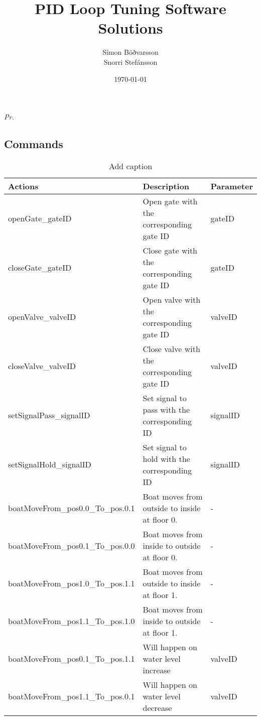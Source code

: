 \documentclass[11pt,a4paper]{article}
\title{PID Loop Tuning Software Solutions}
\author{Símon Böðvarsson \\ Snorri Stefánsson}
\date{\today}
\begin{document}
\textit{Pr.}

\subsection{Commands}

\begin{table}[htbp]
	\centering
	\caption{Add caption}
	\begin{tabular}{lll}
		\toprule
		\textbf{Actions} & \textbf{Description} & \textbf{Parameter} \\
		\midrule
		openGate\_gateID & Open gate with the corresponding gate ID & gateID \\
		closeGate\_gateID & Close gate with the corresponding gate ID & gateID \\
		openValve\_valveID & Open valve with the corresponding gate ID & valveID \\
		closeValve\_valveID & Close valve with the corresponding gate ID & valveID \\
		setSignalPass\_signalID & Set signal to pass with the corresponding ID  & signalID \\
		setSignalHold\_signalID & Set signal to hold with the corresponding ID  & signalID \\
		boatMoveFrom\_pos0.0\_To\_pos.0.1 & Boat moves from outside to inside at floor 0. & - \\
		boatMoveFrom\_pos0.1\_To\_pos.0.0 & Boat moves from inside to outside at floor 0. & - \\
		boatMoveFrom\_pos1.0\_To\_pos.1.1 & Boat moves from outside to inside at floor 1. & - \\
		boatMoveFrom\_pos1.1\_To\_pos.1.0 & Boat moves from inside to outside at floor 1. & - \\
		boatMoveFrom\_pos0.1\_To\_pos.1.1 & Will happen on water level increase & valveID \\
		boatMoveFrom\_pos1.1\_To\_pos.0.1 & Will happen on water level decrease & valveID \\
		\bottomrule
	\end{tabular}%
	\label{tab:addlabel}%
\end{table}%
\end{document}
